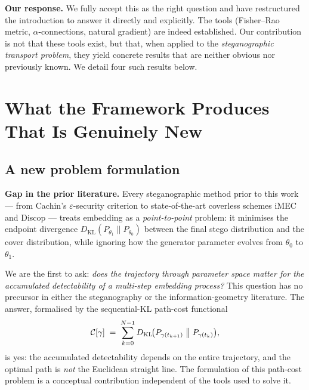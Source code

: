 \documentclass[12pt,a4paper]{article}
\newcommand{\DKL}{D_{\mathrm{KL}}}
\begin{document}
\begin{responsebox}
\textbf{Our response.}
We fully accept this as the right question and have restructured the
introduction to answer it directly and explicitly.
The tools (Fisher--Rao metric, $\alpha$-connections, natural gradient) are
indeed established.
Our contribution is not that these tools exist, but that, when applied to the
\emph{steganographic transport problem}, they yield concrete results that are
neither obvious nor previously known.
We detail four such results below.
\end{responsebox}

\section{What the Framework Produces That Is Genuinely New}

\subsection{A new problem formulation}

\begin{editorbox}
\textbf{Gap in the prior literature.}
Every steganographic method prior to this work --- from Cachin's
$\varepsilon$-security criterion to state-of-the-art coverless schemes
iMEC and Discop --- treats embedding as a \emph{point-to-point} problem: it
minimises the endpoint divergence $\DKL(P_{\theta_1}\|P_{\theta_0})$ between
the final stego distribution and the cover distribution, while ignoring how
the generator parameter evolves from $\theta_0$ to $\theta_1$.
\end{editorbox}

\begin{responsebox}
We are the first to ask: \emph{does the trajectory through parameter space
matter for the accumulated detectability of a multi-step embedding process?}
This question has no precursor in either the steganography or the
information-geometry literature.
The answer, formalised by the sequential-KL path-cost functional
\[
  \mathcal{C}[\gamma]
  \;=\;
  \sum_{k=0}^{N-1}
  \DKL\!\bigl(P_{\gamma(t_{k+1})}\bigm\|P_{\gamma(t_k)}\bigr),
\]
is yes: the accumulated detectability depends on the entire trajectory, and
the optimal path is \emph{not} the Euclidean straight line.
The formulation of this path-cost problem is a conceptual contribution
independent of the tools used to solve it.
\end{responsebox}
\end{document}
